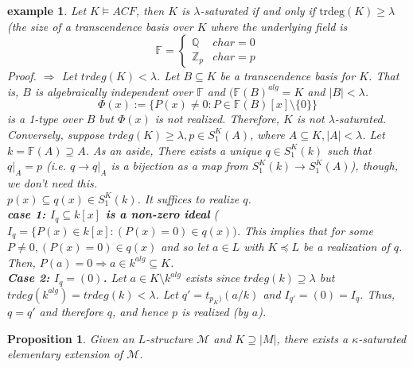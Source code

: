 \documentclass[letterpaper, 12pt]{article}
\newcommand{\fin}{\qquad \quad \hfill \framebox[1.75mm][l]{\,}}
\newcommand{\cM}{\mathcal{M}}
\newcommand{\bZ}{\mathbb{Z}}
\newcommand{\bQ}{\mathbb{Q}}
\newcommand{\bF}{\mathbb{F}}
\theoremstyle{stdthm}
\newtheorem{prop}[thm]{Proposition}
\theoremstyle{stddef}
\newtheorem{eg}[thm]{example} %
\theoremstyle{stdnonum}
\theoremstyle{stdqands}
\theoremstyle{stdbold}
\begin{document}
\begin{eg}
Let $K \models ACF$, then $K$ is $\lambda$-saturated if and only if $\mbox{trdeg}(K) \geq \lambda$ (the size of a transcendence basis over $K$ where the underlying field is 
\[ \bF = 
\begin{cases}
\bQ & char = 0\\
\bZ_p & char = p 
\end{cases}
\]
Proof. $\Rightarrow$ Let $trdeg(K) < \lambda$. Let $B \subseteq K$ be a transcendence basis for $K$. That is, $B$ is algebraically independent over $\bF$ and $(\bF(B)^{alg} = K$ and $|B| < \lambda$. 
\[ \Phi(x) := \{ P(x) \neq 0 : P \in \bF (B)[x] \setminus \{0\} \} \]
is a 1-type over $B$ but $\Phi(x)$ is not realized. Therefore, $K$ is not $\lambda$-saturated.   \\

Conversely, suppose $trdeg(K) \geq \lambda, p \in S_1^K(A)$, where $A \subseteq K, |A| < \lambda$. Let $k = \bF(A) \supseteq A$. As an aside,  There exists a unique $q \in S_1^K(k)$ such that $q|_A = p$ (i.e. $q \to q|_A$ is a bijection as a map from $S_1^K(k) \to S_1^K(A)$), though, we don't need this. \\

$p(x) \subseteq q(x) \in S_1^K(k)$. It suffices to realize $q$. \\

{\bf case 1: $I_q \subseteq k[x]$ is a non-zero ideal} ($I_q = \{P(x) \in k[x] :  (P(x) = 0) \in q(x))$. This implies that for some $P \neq 0, (P(x) = 0) \in q(x)$ and so let $a \in L$ with $K \preceq L$ be a realization of $q$. Then, $P(a) = 0 \Rightarrow a \in k^{alg} \subseteq K$. \\

{\bf Case 2: $I_q = (0)$. } Let $a \in K \setminus k^{alg}$ exists since $trdeg(k) \supseteq \lambda$ but $trdeg(k^{alg}) = trdeg(k) < \lambda$. Let $q' = t_{p_K)}(a/k)$ and $I_{q'} = (0) = I_q$. Thus, $q=q'$ and therefore $q$, and hence $p$ is realized (by $a$). 
\end{eg}

\begin{prop}
Given an $L$-structure $\cM$ and $K \supseteq |M|$, there exists a $\kappa$-saturated elementary extension of $\cM$. 
\end{prop}
\end{document}
